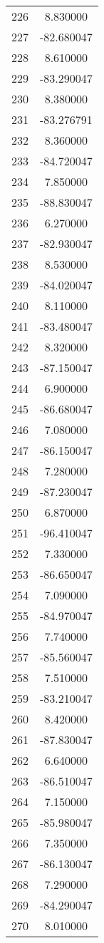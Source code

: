 \documentclass[12pt]{article}
\begin{document}
\begin{longtable}{@{}cc@{}}
226 & 8.830000 \\
227 & -82.680047 \\
228 & 8.610000 \\
229 & -83.290047 \\
230 & 8.380000 \\
231 & -83.276791 \\
232 & 8.360000 \\
233 & -84.720047 \\
234 & 7.850000 \\
235 & -88.830047 \\
236 & 6.270000 \\
237 & -82.930047 \\
238 & 8.530000 \\
239 & -84.020047 \\
240 & 8.110000 \\
241 & -83.480047 \\
242 & 8.320000 \\
243 & -87.150047 \\
244 & 6.900000 \\
245 & -86.680047 \\
246 & 7.080000 \\
247 & -86.150047 \\
248 & 7.280000 \\
249 & -87.230047 \\
250 & 6.870000 \\
251 & -96.410047 \\
252 & 7.330000 \\
253 & -86.650047 \\
254 & 7.090000 \\
255 & -84.970047 \\
256 & 7.740000 \\
257 & -85.560047 \\
258 & 7.510000 \\
259 & -83.210047 \\
260 & 8.420000 \\
261 & -87.830047 \\
262 & 6.640000 \\
263 & -86.510047 \\
264 & 7.150000 \\
265 & -85.980047 \\
266 & 7.350000 \\
267 & -86.130047 \\
268 & 7.290000 \\
269 & -84.290047 \\
270 & 8.010000 \\

\end{longtable}
\end{document}
